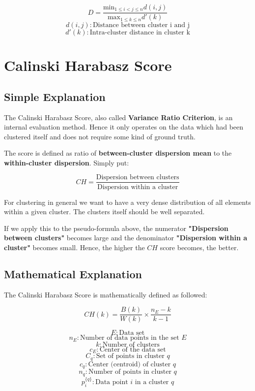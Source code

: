 $$ D = \frac{ \text{min}_{1\leq i < j\leq n} d(i,j) }{ \text{max}_{1 \leq k \leq n} d'(k) } $$
$$ d(i,j) : \text{Distance between cluster i and j}$$
$$d'(k) : \text{Intra-cluster distance in cluster k}$$


\clearpage
\section{Calinski Harabasz Score}
\subsection{Simple Explanation}


The Calinski Harabasz Score, also called \textbf{Variance Ratio Criterion}, is an internal evaluation method. Hence it only operates on the data which had been clustered itself and does not require some kind of ground truth. 


The score is defined as ratio of \textbf{between-cluster dispersion mean} to the \textbf{within-cluster dispersion}.
Simply put:

$$ CH = \frac{\text{Dispersion between clusters}}{\text{Dispersion within a cluster}}  $$

For clustering in general we want to have a very dense distribution of all elements within a given cluster. The clusters itself should be well separated.

If we apply this to the pseudo-formula above, the numerator \textbf{"Dispersion between clusters"} becomes large and the denominator \textbf{"Dispersion within a cluster"} becomes small. Hence, the higher the $CH$ score becomes, the better. 



\clearpage
\subsection{Mathematical Explanation}

The Calinski Harabasz Score is mathematically defined as followed:


$$ CH(k) = \frac{B(k)}{W(k)} \times \frac{n_{E} - k}{k - 1} $$

$$ E : \text{Data set} $$
$$ n_{E} : \text{Number of data points in the set } E $$
$$ k : \text{Number of clusters} $$
$$ c_{E} : \text{Center of the data set} $$
$$ C_{q} : \text{Set of points in cluster } q $$
$$ c_{q} : \text{Center (centroid) of cluster } q $$
$$ n_{q} : \text{Number of points in cluster } q $$
$$p_{i}^{\{q\}} : \text{Data point } i \text{ in a cluster } q $$

